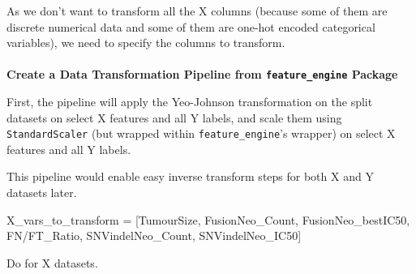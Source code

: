 \documentclass[
  letterpaper,
  DIV=11,
  numbers=noendperiod]{scrartcl}
\makeatletter
\let\oldparagraph\paragraph
\renewcommand{\paragraph}{
    \@ifstar
      \xxxParagraphStar
      \xxxParagraphNoStar
  }
\newcommand{\xxxParagraphStar}[1]{\oldparagraph*{#1}\mbox{}}
\newcommand{\xxxParagraphNoStar}[1]{\oldparagraph{#1}\mbox{}}
\newenvironment{Shaded}{\begin{snugshade}}{\end{snugshade}}
\newcommand{\NormalTok}[1]{\textcolor[rgb]{0.00,0.23,0.31}{#1}}
\newcommand{\OperatorTok}[1]{\textcolor[rgb]{0.37,0.37,0.37}{#1}}
\newcommand{\StringTok}[1]{\textcolor[rgb]{0.13,0.47,0.30}{#1}}
\makeatother
\begin{document}
As we don't want to transform all the X columns (because some of them
are discrete numerical data and some of them are one-hot encoded
categorical variables), we need to specify the columns to transform.

\paragraph{\texorpdfstring{\textbf{Create a Data Transformation Pipeline
from \texttt{feature\_engine}
Package}}{Create a Data Transformation Pipeline from feature\_engine Package}}\label{create-a-data-transformation-pipeline-from-feature_engine-package}

First, the pipeline will apply the Yeo-Johnson transformation on the
split datasets on select X features and all Y labels, and scale them
using \texttt{StandardScaler} (but wrapped within
\texttt{feature\_engine}'s wrapper) on select X features and all Y
labels.

This pipeline would enable easy inverse transform steps for both X and Y
datasets later.

\begin{Shaded}
\begin{Highlighting}[]
\NormalTok{X\_vars\_to\_transform }\OperatorTok{=}\NormalTok{ [}\StringTok{\textquotesingle{}TumourSize\textquotesingle{}}\NormalTok{, }\StringTok{\textquotesingle{}FusionNeo\_Count\textquotesingle{}}\NormalTok{, }\StringTok{\textquotesingle{}FusionNeo\_bestIC50\textquotesingle{}}\NormalTok{, }\StringTok{\textquotesingle{}FN/FT\_Ratio\textquotesingle{}}\NormalTok{, }\StringTok{\textquotesingle{}SNVindelNeo\_Count\textquotesingle{}}\NormalTok{, }\StringTok{\textquotesingle{}SNVindelNeo\_IC50\textquotesingle{}}\NormalTok{]}
\end{Highlighting}
\end{Shaded}

Do for X datasets.
\end{document}
